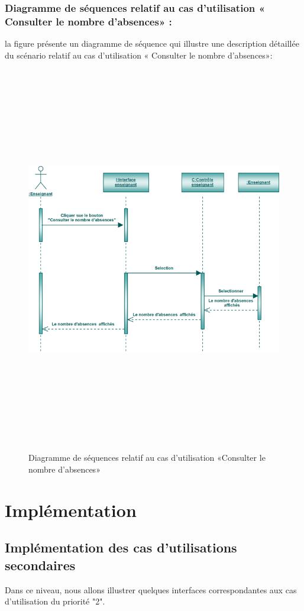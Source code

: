 \documentclass[12 pt]{report}
\begin{document}
\subsubsection{Diagramme de séquences relatif au cas d’utilisation « Consulter le nombre d'absences» :}
la figure   présente un diagramme de séquence qui illustre une description détaillée du scénario relatif au cas d’utilisation « Consulter le nombre d'absences»: 
\begin{figure}[h]
 \begin{center}
\includegraphics[width= 18 cm ,height=  17cm]{sca.PNG}
\caption{Diagramme de séquences relatif au cas d’utilisation «Consulter le nombre d'absences»}

\end{center}
\end{figure}
\section{Implémentation}
\subsection{Implémentation des cas d'utilisations secondaires }
Dans ce niveau, nous allons illustrer quelques interfaces correspondantes aux cas d'utilisation du priorité "2".\\
\end{document}
